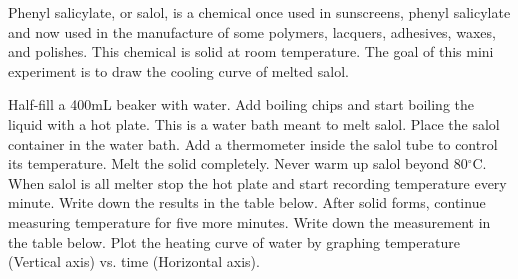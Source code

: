 \documentclass[main.tex]{subfiles}
\begin{document}
\newpage
\begin{fullwidth}
\begin{center}
\end{center}

\vspace{0.2cm}{\large \bfseries 2. Cooling curve of salol}
Phenyl salicylate, or salol, is a chemical once used in sunscreens, phenyl salicylate and now used in the manufacture of some polymers, lacquers, adhesives, waxes, and polishes. This chemical is solid at room temperature. The goal of this mini experiment is to draw the cooling curve of melted salol.
\begin{steps}
    \newstep[] Half-fill a 400mL beaker with water. Add boiling chips and start boiling the liquid with a hot plate. This is a water bath meant to melt salol.
        \newstep[]  Place the salol container in the water bath. Add a thermometer inside the salol tube to control its temperature. Melt the solid completely. Never warm up salol beyond 80$^\circ$C.
        \newstep[]  When salol is all melter stop the hot plate and start recording temperature every minute. Write down the results in the table below.
    \newstep[] After solid forms, continue measuring temperature for five more minutes.
      \newstep[] Write down the measurement in the table below. 
      \newstep[] Plot the heating curve of water by graphing temperature (Vertical axis) vs. time (Horizontal axis).
\end{steps}


\end{fullwidth}
\end{document}

